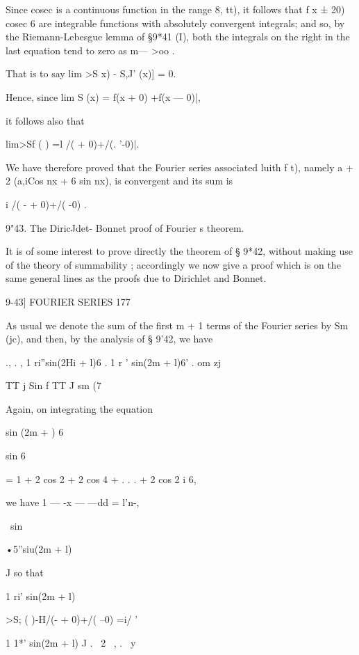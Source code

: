 Since cosec is a continuous function in the range 8, tt), it follows
that f x ± 20) cosec 6 are integrable functions with absolutely
convergent integrals; and so, by the Riemann-Lebesgue lemma of §9*41
(I), both the integrals on the right in the last equation tend to zero
as m— >oo .

That is to say lim >S x) - S,J' (x)] = 0.

Hence, since lim S (x) = f(x + 0) +f(x — 0)|,

it follows also that

lim>Sf ( ) =l /( + 0)+/(. '-0)|.

We have therefore proved that the Fourier series associated luith f
t), namely a + 2 (a,iCos nx + 6 sin nx), is convergent and its sum is

i /( - + 0)+/( -0) .

9"43. The DiricJdet- Bonnet proof of Fourier s theorem.

It is of some interest to prove directly the theorem of § 9*42,
without making use of the theory of summability ; accordingly we now
give a proof which is on the same general lines as the proofs due to
Dirichlet and Bonnet.



9-43] FOURIER SERIES 177

As usual we denote the sum of the first m + 1 terms of the Fourier
series by Sm (jc), and then, by the analysis of § 9'42, we have

., . , 1 ri''sin(2Hi + l)6 . 1 r ' sin(2m + l)6' . om zj

TT j Sin f TT J sm (7

Again, on integrating the equation

sin (2m + ) 6



sin 6



= 1 + 2 cos 2 + 2 cos 4 + . . . + 2 cos 2 i 6,



we have 1 — -x — —dd = l'n-,

\ sin



•5''siu(2m + l)

J so that

1 ri' sin(2m + l)



>S; ( )-H/(- + 0)+/( --0) =i/ '



  1 1*' sin(2m + l) J . \ 2 \ , . \ y



